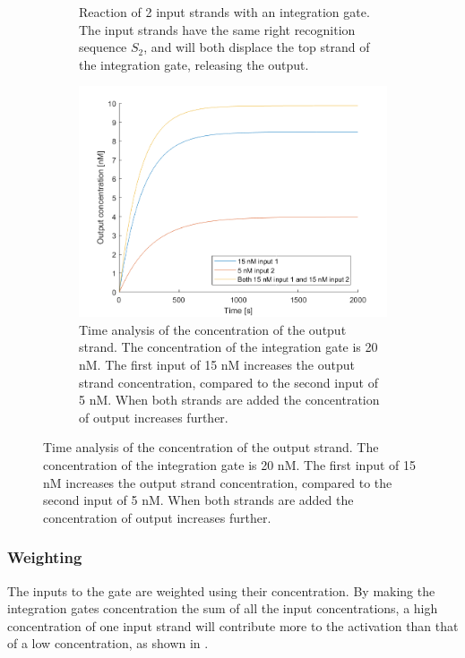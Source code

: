 \begin{figure}[H]
  \begin{subfigure}[t]{.49\columnwidth}
    \centering
{} {

}
\caption{Reaction of 2 input strands with an integration gate. The input strands have the same right recognition sequence $S_2$, and will both displace the top strand of the integration gate, releasing the output.}
\label{}
\end{subfigure}
\hfill
\begin{subfigure}[t]{.49\columnwidth}
  \centering
\includegraphics[width=\linewidth]{images/integration.png}
\caption{Time analysis of the concentration of the output strand. The concentration of the integration gate is 20 nM. The first input of 15 nM increases the output strand concentration, compared to the second input of 5 nM. When both strands are added the concentration of output increases further.}
\label{}
\end{subfigure}
\label{seesaw_integration}
\end{figure}

\subsubsection{Weighting}
The inputs to the gate are weighted using their concentration. By making the integration gates concentration the sum of all the input concentrations, a high concentration of one input strand will contribute more to the activation than that of a low concentration, as shown in .

